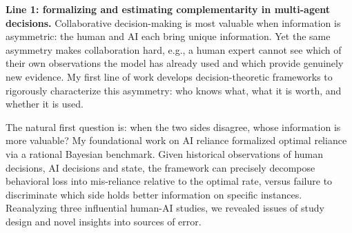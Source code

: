 
\setlength{\parindent}{\myindent}
\setlength{\parskip}{\myparskip}


\textbf{Line 1: formalizing and estimating complementarity in multi-agent decisions.}
Collaborative decision-making is most valuable when information is asymmetric: the human and AI each bring unique information.
Yet the same asymmetry makes collaboration hard, e.g., a human expert cannot see which of their own observations the model has already used and which provide genuinely new evidence. 
My first line of work develops decision-theoretic frameworks to rigorously characterize this asymmetry: who knows what, what it is worth, and whether it is used.

The natural first question is: when the two sides disagree, whose information is more valuable?
My foundational work on AI reliance \cite{guo2024decision} formalized optimal reliance via a rational Bayesian benchmark.
Given historical observations of human decisions, AI decisions and state, the framework can precisely decompose behavioral loss into mis-reliance relative to the optimal rate, versus failure to discriminate which side holds better information on specific instances.
Reanalyzing three influential human-AI studies, we revealed issues of study design and novel insights into sources of error.

 
